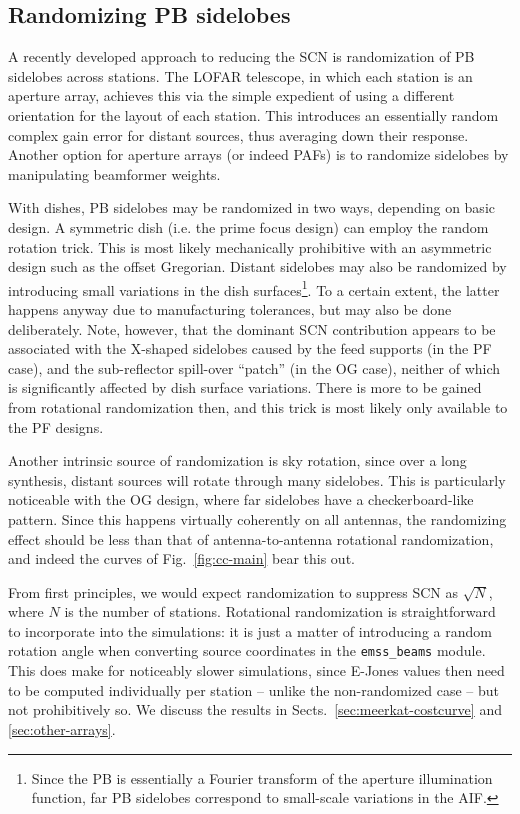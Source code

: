 \documentclass{aa}
\begin{document}
\subsection{Randomizing PB sidelobes}
\label{sec:randomizing}

A recently developed approach to reducing the SCN is randomization of PB sidelobes across stations. The LOFAR telescope, in which each station is an aperture array, achieves this via the simple expedient of using a different orientation for the layout of each station. This introduces an essentially random complex gain error for distant sources, thus averaging down their response. Another option for aperture arrays (or indeed PAFs) is to randomize sidelobes by manipulating beamformer weights.

With dishes, PB sidelobes may be randomized in two ways, depending on basic design. A symmetric dish (i.e. the prime focus design) can employ the random rotation trick. This is most likely mechanically prohibitive with an asymmetric design such as the offset Gregorian. Distant sidelobes may also be randomized by introducing small variations in the dish surfaces\footnote{Since the PB is essentially a Fourier transform of the aperture illumination function, far PB sidelobes correspond to small-scale variations in the AIF.}. To a certain extent, the latter happens anyway due to manufacturing tolerances, but may also be done deliberately. Note, however, that the dominant SCN contribution appears to be associated with the X-shaped sidelobes caused by the feed supports (in the PF case), and the sub-reflector spill-over ``patch'' (in the OG case), neither of which is significantly affected by dish surface variations. There is more to be gained from rotational randomization then, and this trick is most likely only 
available to the PF designs.

Another intrinsic source of randomization is sky rotation, since over a long synthesis, distant sources will rotate through many sidelobes. This is particularly noticeable with the OG design, where far sidelobes have a checkerboard-like pattern. Since this happens virtually coherently on all antennas, the randomizing effect should be less than that of antenna-to-antenna rotational randomization, and indeed the curves of Fig.~\ref{fig:cc-main} bear this out.

From first principles, we would expect randomization to suppress SCN as $\sqrt{N}$, where $N$ is the number of stations. Rotational randomization is straightforward to incorporate into the simulations: it is just a matter of introducing a random rotation angle when converting source coordinates in the {\tt emss\_beams} module. This does make for noticeably slower simulations, since E-Jones values then need to be computed individually per station -- unlike the non-randomized case -- but not prohibitively so. We discuss the results in Sects.~\ref{sec:meerkat-costcurve} and \ref{sec:other-arrays}.
\end{document}
